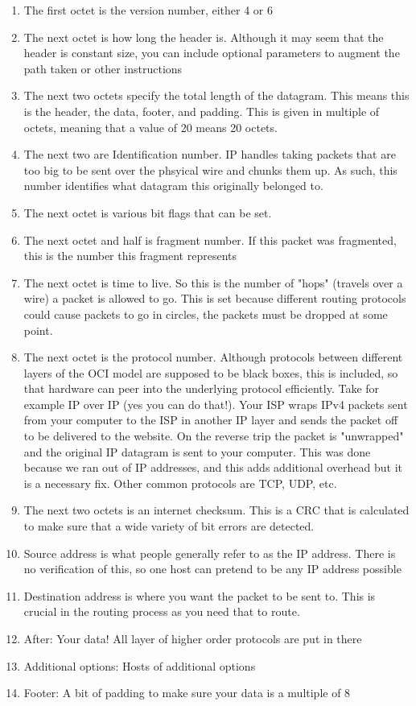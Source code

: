 \begin{enumerate}
  \item The first octet is the version number, either 4 or 6
  \item The next octet is how long the header is.
    Although it may seem that the header is constant size, you can include optional parameters to augment the path taken or other instructions
  \item The next two octets specify the total length of the datagram.
    This means this is the header, the data, footer, and padding.
    This is given in multiple of octets, meaning that a value of 20 means 20 octets.
  \item The next two are Identification number.
    IP handles taking packets that are too big to be sent over the phsyical wire and chunks them up.
    As such, this number identifies what datagram this originally belonged to.
  \item The next octet is various bit flags that can be set.
  \item The next octet and half is fragment number.
    If this packet was fragmented, this is the number this fragment represents
  \item The next octet is time to live.
    So this is the number of "hops" (travels over a wire) a packet is allowed to go.
    This is set because different routing protocols could cause packets to go in circles, the packets must be dropped at some point.
  \item The next octet is the protocol number.
    Although protocols between different layers of the OCI model are supposed to be black boxes, this is included, so that hardware can peer into the underlying protocol efficiently.
    Take for example IP over IP (yes you can do that!).
    Your ISP wraps IPv4 packets sent from your computer to the ISP in another IP layer and sends the packet off to be delivered to the website.
    On the reverse trip the packet is "unwrapped" and the original IP datagram is sent to your computer.
    This was done because we ran out of IP addresses, and this adds additional overhead but it is a necessary fix.
    Other common protocols are TCP, UDP, etc.
  \item The next two octets is an internet checksum.
    This is a CRC that is calculated to make sure that a wide variety of bit errors are detected.
  \item Source address is what people generally refer to as the IP address.
    There is no verification of this, so one host can pretend to be any IP address possible
  \item Destination address is where you want the packet to be sent to.
    This is crucial in the routing process as you need that to route.
  \item After: Your data! All layer of higher order protocols are put in there
  \item Additional options: Hosts of additional options
  \item Footer: A bit of padding to make sure your data is a multiple of 8
\end{enumerate}


